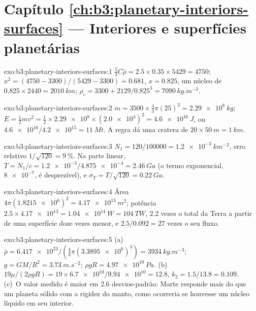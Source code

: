 \section*{Capítulo \ref{ch:b3:planetary-interiors-surfaces} --- Interiores e superfícies planetárias}

\begin{solution}{exo:b3:planetary-interiors-surfaces:1}
$\tfrac52C\bar\rho = 2.5\times0.35\times5429 = 4750$; $x^2 = (4750 -
3300)/(5429 - 3300) = 0.681$, $x = 0.825$, um núcleo de $0.825\times2440 =
\qty{2010}{km}$; $\rho_c = 3300 + 2129/0.825^3 = \qty{7090}{kg.m^{-3}}$.
\end{solution}

\begin{solution}{exo:b3:planetary-interiors-surfaces:2}
$m = 3500\times\tfrac43\pi(25)^3 = \qty{2.29e8}{kg}$; $E = \tfrac12 m v^2 =
\tfrac12\times\num{2.29e8}\times(\num{2.0e4})^2 = \qty{4.6e16}{J}$, ou
$\num{4.6e16}/\num{4.2e15} = \qty{11}{Mt}$. A regra dá uma cratera de
$20\times\qty{50}{m} = \qty{1}{km}$.
\end{solution}

\begin{solution}{exo:b3:planetary-interiors-surfaces:3}
$N_1 = 120/\num{100000} = \qty{1.2e-3}{km^{-2}}$, erro relativo $1/\sqrt{120}
= \qty{9}{\percent}$. Na parte linear, $T = N_1/c = \num{1.2e-3}/\num{4.875e-4}
= \qty{2.46}{Ga}$ (o termo exponencial, $\num{8e-7}$, é desprezível), e
$\sigma_T = T/\sqrt{120} = \qty{0.22}{Ga}$.
\end{solution}

\begin{solution}{exo:b3:planetary-interiors-surfaces:4}
Área $4\pi(\num{1.8215e6})^2 = \qty{4.17e13}{m^2}$; potência $2.5\times
\num{4.17e13} = \qty{1.04e14}{W} = \qty{104}{TW}$, 2.2 vezes o total da Terra
a partir de uma superfície doze vezes menor, e $2.5/0.092 = 27$ vezes o seu
fluxo.
\end{solution}

\begin{solution}{exo:b3:planetary-interiors-surfaces:5}
(a)~$\bar\rho = \num{6.417e23}/(\tfrac43\pi(\num{3.3895e6})^3) =
\qty{3934}{kg.m^{-3}}$; $g = GM/R^2 = \qty{3.73}{m.s^{-2}}$; $\rho gR =
\qty{4.97e10}{Pa}$. (b)~$19\mu/(2\rho gR) = 19\times\num{6.7e10}/\num{9.94e10}
= 12.8$, $k_2 = 1.5/13.8 = 0.109$. (c)~O valor medido é maior em
2.6 desvios-padrão: Marte responde mais do que um planeta sólido com a
rigidez do manto, como ocorreria se houvesse um núcleo líquido em seu interior.
\end{solution}

